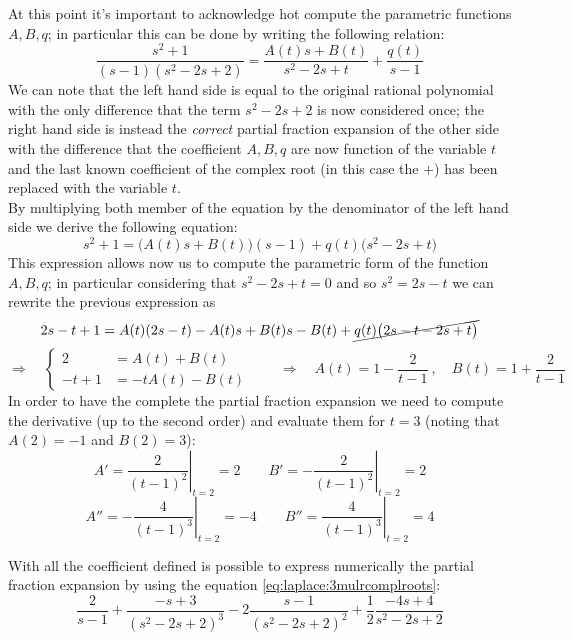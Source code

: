 	At this point it's important to acknowledge hot compute the parametric functions $A,B,q$; in particular this can be done by writing the following relation:
	\[ \frac{s^2+1}{(s-1)(s^2-2s+2)} = \frac{A(t)s+B(t)}{s^2-2s+t} + \frac{q(t)}{s-1} \]
	We can note that the left hand side is equal to the original rational polynomial with the only difference that the term $s^2-2s+2$ is now considered once; the right hand side is instead the \textit{correct} partial fraction expansion of the other side with the difference that the coefficient $A,B,q$ are now function of the variable $t$ and the last known coefficient of the complex root (in this case the $+$) has been replaced with the variable $t$. \\
	By multiplying both member of the equation by the denominator of the left hand side we derive the following equation:
	\[ s^2+1= \Big(A(t)s + B(t)\Big) (s-1) + q(t) \big(s^2-2s+t\big) \]
	This expression allows now us to compute the parametric form of the function $A,B,q$; in particular considering that $s^2-2s+t= 0$ and so $s^2 = 2s-t$ we can rewrite the previous expression as
	\[ 2s-t+1 = A(t)(2s-t) - A(t) s + B(t)s -B(t) + \cancel{q(t) \big(2s-t - 2s +t\big)} \]
	\[\Rightarrow \quad \begin{cases}
		2 & = A(t) + B(t) \\
		-t+1 & =-tA(t) - B(t) 
	\end{cases} \qquad \Rightarrow \quad A(t) = 1 - \frac{2}{t-1} \ , \quad B(t) = 1 + \frac{2}{t-1} \]
	In order to have the complete the partial fraction expansion we need to compute the derivative (up to the second order) and evaluate them for $t=3$ (noting that $A(2) = -1 $ and $B(2) = 3$):
	\[ A' = \left.\frac{2}{(t-1)^2}\right|_{t=2} = 2 \qquad B' =  \left.-\frac{2}{(t-1)^2}\right|_{t=2} = 2 \]
	\[ A'' = \left. -\frac 4{(t-1)^3} \right|_{t=2} = -4 \qquad B'' = \left. \frac 4{(t-1)^3} \right|_{t=2} = 4 \]
	
	With all the coefficient defined is possible to express numerically the partial fraction expansion by using the equation \ref{eq:laplace:3mulrcomplroots}:
	\[ \frac 2 {s-1} + \frac{-s + 3}{(s^2-2s+2)^3} -2 \frac{s-1}{(s^2-2s+2)^2} + \frac 12 \frac{-4s+4}{s^2-2s+2}\]

